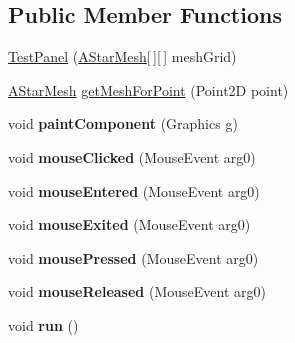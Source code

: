 \subsection*{Public Member Functions}
\begin{DoxyCompactItemize}
\item 
\hyperlink{classtest_1_1core_1_1_test_panel_a800782da9f5f659e10186692b24bcdd4}{Test\-Panel} (\hyperlink{classa__star_1_1example_1_1_a_star_mesh}{A\-Star\-Mesh}\mbox{[}$\,$\mbox{]}\mbox{[}$\,$\mbox{]} mesh\-Grid)
\item 
\hyperlink{classa__star_1_1example_1_1_a_star_mesh}{A\-Star\-Mesh} \hyperlink{classtest_1_1core_1_1_test_panel_a68004836b21a2f98288eb3707e2b5b70}{get\-Mesh\-For\-Point} (Point2\-D point)
\item 
\hypertarget{classtest_1_1core_1_1_test_panel_a5fedf62818cc16c1a6c2cf65af884243}{void {\bfseries paint\-Component} (Graphics g)}\label{classtest_1_1core_1_1_test_panel_a5fedf62818cc16c1a6c2cf65af884243}

\item 
\hypertarget{classtest_1_1core_1_1_test_panel_ad6f7281f40299f2a2dd4ee3f522fdde7}{void {\bfseries mouse\-Clicked} (Mouse\-Event arg0)}\label{classtest_1_1core_1_1_test_panel_ad6f7281f40299f2a2dd4ee3f522fdde7}

\item 
\hypertarget{classtest_1_1core_1_1_test_panel_aba76a7f62f14ca4986e2b644d5dccb6b}{void {\bfseries mouse\-Entered} (Mouse\-Event arg0)}\label{classtest_1_1core_1_1_test_panel_aba76a7f62f14ca4986e2b644d5dccb6b}

\item 
\hypertarget{classtest_1_1core_1_1_test_panel_ac27894fcc70166fdb60eeab851a84e8b}{void {\bfseries mouse\-Exited} (Mouse\-Event arg0)}\label{classtest_1_1core_1_1_test_panel_ac27894fcc70166fdb60eeab851a84e8b}

\item 
\hypertarget{classtest_1_1core_1_1_test_panel_a1ecedb4ae346e2e66b961d01502859d3}{void {\bfseries mouse\-Pressed} (Mouse\-Event arg0)}\label{classtest_1_1core_1_1_test_panel_a1ecedb4ae346e2e66b961d01502859d3}

\item 
\hypertarget{classtest_1_1core_1_1_test_panel_aa95cebcbb7ba1f174411a96aa16d1250}{void {\bfseries mouse\-Released} (Mouse\-Event arg0)}\label{classtest_1_1core_1_1_test_panel_aa95cebcbb7ba1f174411a96aa16d1250}

\item 
\hypertarget{classtest_1_1core_1_1_test_panel_a2031483b4a20bd3ff925d96aa1a3fde9}{void {\bfseries run} ()}\label{classtest_1_1core_1_1_test_panel_a2031483b4a20bd3ff925d96aa1a3fde9}


\end{DoxyCompactItemize}
